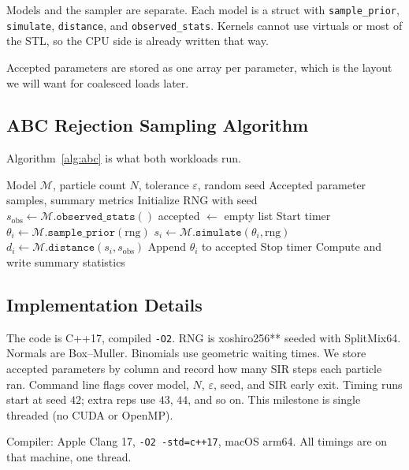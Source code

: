 \documentclass[conference]{IEEEtran}
\begin{document}
Models and the sampler are separate. Each model is a struct with
\texttt{sample\_prior}, \texttt{simulate}, \texttt{distance}, and
\texttt{observed\_stats}. Kernels cannot use virtuals or most of the STL, so
the CPU side is already written that way.

Accepted parameters are stored as one array per parameter, which is the layout
we will want for coalesced loads later.

\subsection{ABC Rejection Sampling Algorithm}

Algorithm~\ref{alg:abc} is what both workloads run.

\begin{algorithm}[H]
\caption{Sequential ABC rejection sampling.}
\label{alg:abc}
\begin{algorithmic}[1]
\REQUIRE Model $\mathcal{M}$, particle count $N$, tolerance $\varepsilon$,
         random seed
\ENSURE Accepted parameter samples, summary metrics
\STATE Initialize RNG with seed
\STATE $s_{\mathrm{obs}} \leftarrow \mathcal{M}.\texttt{observed\_stats}()$
\STATE accepted $\leftarrow$ empty list
\STATE Start timer
    \STATE $\theta_i \leftarrow \mathcal{M}.\texttt{sample\_prior}(\text{rng})$
    \STATE $s_i \leftarrow \mathcal{M}.\texttt{simulate}(\theta_i, \text{rng})$
    \STATE $d_i \leftarrow \mathcal{M}.\texttt{distance}(s_i, s_{\mathrm{obs}})$
        \STATE Append $\theta_i$ to accepted
    \ENDIF
\ENDFOR
\STATE Stop timer
\STATE Compute and write summary statistics
\end{algorithmic}
\end{algorithm}

\subsection{Implementation Details}

The code is C++17, compiled \texttt{-O2}. RNG is xoshiro256** seeded with
SplitMix64. Normals are Box--Muller. Binomials use geometric waiting times.
We store accepted parameters by column and record how many SIR steps each
particle ran. Command line flags cover model, $N$, $\varepsilon$, seed, and
SIR early exit. Timing runs start at seed $42$; extra reps use $43$, $44$,
and so on. This milestone is single threaded (no CUDA or OpenMP).

Compiler: Apple Clang 17, \texttt{-O2 -std=c++17}, macOS arm64. All timings
are on that machine, one thread.
\end{document}
